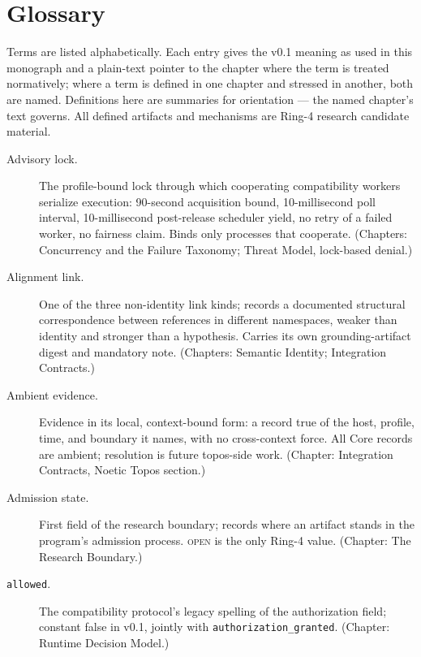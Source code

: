 \chapter{Glossary}\label{gloss:chapter}

Terms are listed alphabetically. Each entry gives the v0.1 meaning as used in this monograph and a plain-text pointer to the chapter where the term is treated normatively; where a term is defined in one chapter and stressed in another, both are named. Definitions here are summaries for orientation --- the named chapter's text governs. All defined artifacts and mechanisms are Ring-4 research candidate material.

\begin{description}

\item[Advisory lock.] The profile-bound lock through which cooperating compatibility workers serialize execution: 90-second acquisition bound, 10-millisecond poll interval, 10-millisecond post-release scheduler yield, no retry of a failed worker, no fairness claim. Binds only processes that cooperate. (Chapters: Concurrency and the Failure Taxonomy; Threat Model, lock-based denial.)

\item[Alignment link.] One of the three non-identity link kinds; records a documented structural correspondence between references in different namespaces, weaker than identity and stronger than a hypothesis. Carries its own grounding-artifact digest and mandatory note. (Chapters: Semantic Identity; Integration Contracts.)

\item[Ambient evidence.] Evidence in its local, context-bound form: a record true of the host, profile, time, and boundary it names, with no cross-context force. All Core records are ambient; resolution is future topos-side work. (Chapter: Integration Contracts, Noetic Topos section.)

\item[Admission state.] First field of the research boundary; records where an artifact stands in the program's admission process. \textsc{open} is the only Ring-4 value. (Chapter: The Research Boundary.)

\item[\texttt{allowed}.] The compatibility protocol's legacy spelling of the authorization field; constant false in v0.1, jointly with \texttt{authorization\_granted}. (Chapter: Runtime Decision Model.)


\end{description}
